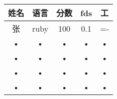 \begin{tabular}{|c|c|c|c|c|}
\hline 
姓名 & 语言 & 分数 & fds & 工 \\ 
\hline 
张 & ruby & 100 & 0.1 & =- \\ 
\hline 
• & • & • & • & • \\ 
\hline 
• & • & • & • & • \\ 
\hline 
• & • & • & • & • \\ 
\hline 
• & • & • & • & • \\ 
\hline 
\end{tabular} 

\maketitle